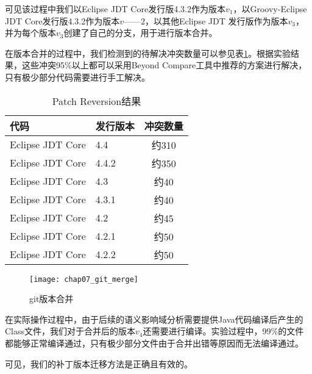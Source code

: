 可见该过程中我们以Eclipse JDT Core发行版4.3.2作为版本$v_1$，以Groovy-Eclipse JDT Core发行版4.3.2作为版本$v——2$，以其他Eclipse JDT 发行版作为版本$v_3$，并为每个版本$v_3$创建了自己的分支，用于进行版本合并。


在版本合并的过程中，我们检测到的待解决冲突数量可以参见表\ref {data_git_merge}。根据实验结果，这些冲突95\%以上都可以采用Beyond Compare工具中推荐的方案进行解决，只有极少部分代码需要进行手工解决。

\begin{table}
	\caption{Patch Reversion结果}
	\label{data_git_merge}
	\centering
	\begin{tabular}{llc}
		\toprule[1.5pt]
		{\heiti 代码} & {\heiti 发行版本} & {\heiti 冲突数量} \\\midrule[1pt]
		Eclipse JDT Core & 4.4 & 约310\\
		Eclipse JDT Core & 4.4.2 & 约350\\
		Eclipse JDT Core & 4.3 & 约40\\
		Eclipse JDT Core & 4.3.1 & 约40\\
		Eclipse JDT Core & 4.2 & 约45\\
		Eclipse JDT Core & 4.2.1 & 约50\\
		Eclipse JDT Core & 4.2.2 & 约50\\
		\bottomrule[1.5pt]
	\end{tabular}
\end{table}


\begin{figure}[H]
	\centering
	\texttt{[image: chap07\_git\_merge]}
	\caption {git版本合并}
	\label {exp_git_merge}	
\end{figure}

在实际操作过程中，由于后续的语义影响域分析需要提供Java代码编译后产生的Class文件，我们对于合并后的版本$v_4$还需要进行编译。实验过程中，99\%的文件都能够正常编译通过，只有极少部分文件由于合并出错等原因而无法编译通过。

可见，我们的补丁版本迁移方法是正确且有效的。

%
%

